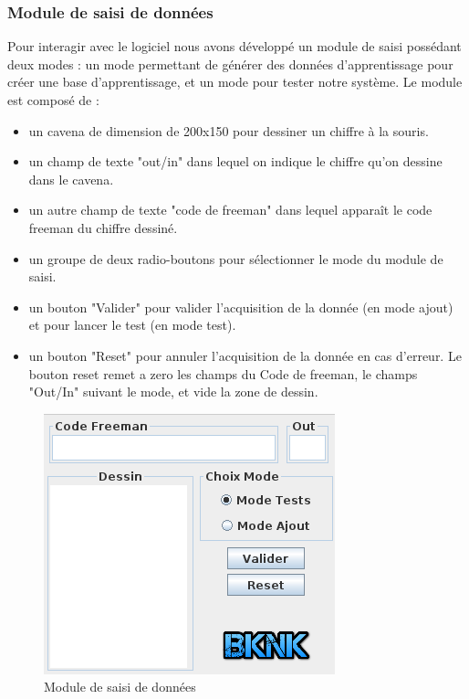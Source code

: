 \documentclass[10pt,a4paper]{report}
\begin{document}
\subsubsection{Module de saisi de données}
\begin{flushleft}
Pour interagir avec le logiciel nous avons développé un module de saisi possédant deux modes : un mode permettant de générer des données d'apprentissage pour créer une base d'apprentissage, et un mode pour tester notre système.\newline \newline
Le module est composé de :

\begin{itemize}[label=$-$,leftmargin=*,parsep=0cm,itemsep=0.1cm,topsep=0cm]
\item un cavena de dimension de 200x150 pour dessiner un chiffre à la souris.

\item un champ de texte "out/in" dans lequel on indique le chiffre qu'on dessine dans le cavena.

\item un autre champ de texte "code de freeman" dans lequel apparaît le code freeman du chiffre dessiné.

\item un groupe de deux radio-boutons pour sélectionner le mode du module de saisi.

\item un bouton "Valider" pour valider l'acquisition de la donnée (en mode ajout) et pour lancer le test (en mode test).
\item un bouton "Reset" pour annuler l'acquisition de la donnée en cas d'erreur. Le bouton reset remet a zero les champs du Code de freeman, le champs "Out/In" suivant le mode, et vide la zone de dessin.
\end{itemize}

\end{flushleft}

\begin{figure}[!h]
	\center
		\includegraphics[scale=0.5]{./Ressource/Module_saisi.png}
 	\caption{Module de saisi de données}
\end{figure}
\end{document}
